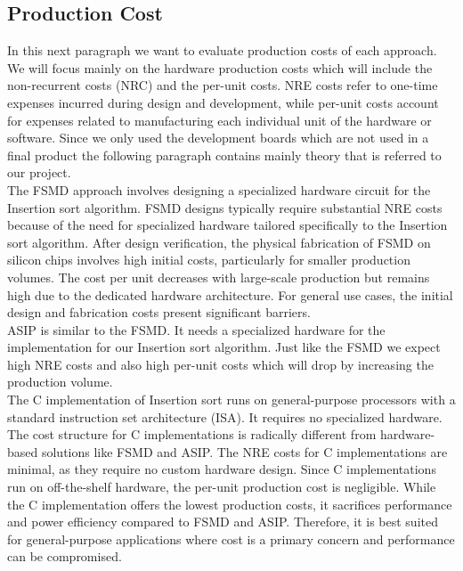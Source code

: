 \documentclass[conference]{IEEEtran}
\begin{document}
\subsection{Production Cost}
In this next paragraph we want to evaluate production costs of each approach. We will focus mainly on the hardware production costs which will include the non-recurrent costs (NRC) and the per-unit costs. NRE costs refer to one-time expenses incurred during design and development, while per-unit costs account for expenses related to manufacturing each individual unit of the hardware or software. Since we only used the development boards which are not used in a final product the following paragraph contains mainly theory that is referred to our project.\\
The FSMD approach involves designing a specialized hardware circuit for the Insertion sort algorithm. FSMD designs typically require substantial NRE costs because of the need for specialized hardware tailored specifically to the Insertion sort algorithm. After design verification, the physical fabrication of FSMD on silicon chips involves high initial costs, particularly for smaller production volumes. The cost per unit decreases with large-scale production but remains high due to the dedicated hardware architecture. For general use cases, the initial design and fabrication costs present significant barriers.\\
ASIP is similar to the FSMD. It needs a specialized hardware for the implementation for our Insertion sort algorithm. Just like the FSMD we expect high NRE costs and also high per-unit costs which will drop by increasing the production volume.\\
The C implementation of Insertion sort runs on general-purpose processors with a standard instruction set architecture (ISA). It requires no specialized hardware. The cost structure for C implementations is radically different from hardware-based solutions like FSMD and ASIP. The NRE costs for C implementations are minimal, as they require no custom hardware design. Since C implementations run on off-the-shelf hardware, the per-unit production cost is negligible. 
While the C implementation offers the lowest production costs, it sacrifices performance and power efficiency compared to FSMD and ASIP. Therefore, it is best suited for general-purpose applications where cost is a primary concern and performance can be compromised.\\
\end{document}
